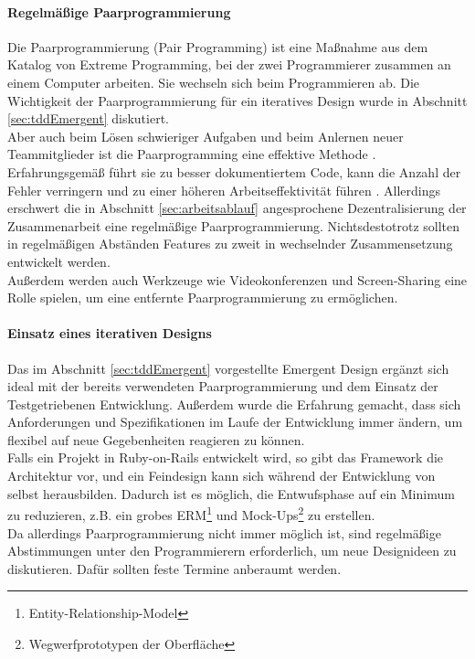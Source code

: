 \paragraph{Regelmäßige Paarprogrammierung} Die Paarprogrammierung (Pair Programming) ist eine Maßnahme aus dem Katalog von Extreme Programming, bei der zwei Programmierer zusammen an einem Computer arbeiten. Sie wechseln sich beim Programmieren ab. Die Wichtigkeit der Paarprogrammierung für ein iteratives Design wurde in Abschnitt \ref{sec:tddEmergent} diskutiert.\\ Aber auch beim Lösen schwieriger Aufgaben und beim Anlernen neuer Teammitglieder ist die Paarprogramming eine effektive Methode \citep[S. 9]{hulkko_multiple_2005}. Erfahrungsgemäß führt sie zu besser dokumentiertem Code, kann die Anzahl der Fehler verringern und zu einer höheren Arbeitseffektivität führen \citep{hulkko_multiple_2005}.
Allerdings erschwert die in Abschnitt \ref{sec:arbeitsablauf} angesprochene Dezentralisierung der Zusammenarbeit eine regelmäßige Paarprogrammierung. Nichtsdestotrotz sollten in regelmäßigen Abständen Features zu zweit in wechselnder Zusammensetzung entwickelt werden.\\
Außerdem werden auch Werkzeuge wie Videokonferenzen und Screen-Sharing eine Rolle spielen, um eine entfernte Paarprogrammierung zu ermöglichen.

\paragraph{Einsatz eines iterativen Designs} Das im Abschnitt \ref{sec:tddEmergent} vorgestellte Emergent Design ergänzt sich ideal mit der bereits verwendeten Paarprogrammierung und dem Einsatz der Testgetriebenen Entwicklung. Außerdem wurde die Erfahrung gemacht, dass sich Anforderungen und Spezifikationen im Laufe der Entwicklung immer ändern, um flexibel auf neue Gegebenheiten reagieren zu können.\\
Falls ein Projekt in Ruby-on-Rails entwickelt wird, so gibt das Framework die Architektur vor, und ein Feindesign kann sich während der Entwicklung von selbst herausbilden. Dadurch ist es möglich, die Entwufsphase auf ein Minimum zu reduzieren, z.B. ein grobes ERM\footnote{Entity-Relationship-Model} und Mock-Ups\footnote{Wegwerfprototypen der Oberfläche} zu erstellen.\\
Da allerdings Paarprogrammierung nicht immer möglich ist, sind regelmäßige Abstimmungen unter den Programmierern erforderlich, um neue Designideen zu diskutieren. Dafür sollten feste Termine anberaumt werden.


